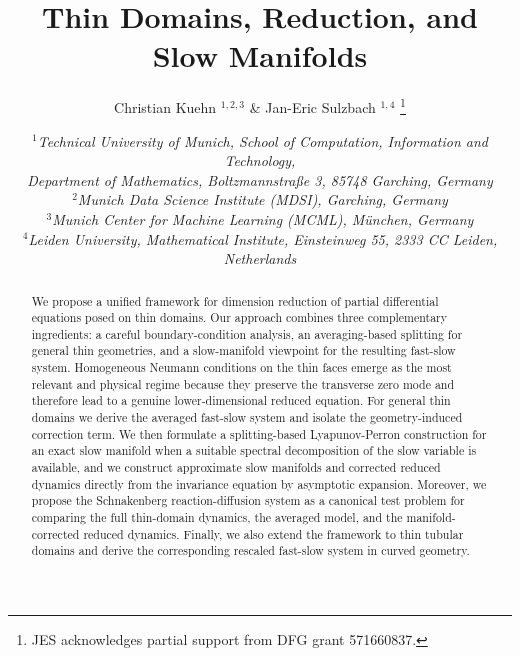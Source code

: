 \documentclass[11pt]{article}
\theoremstyle{definition}
\theoremstyle{remark}
\numberwithin{equation}{section}
\begin{document}
\title{\bf Thin Domains, Reduction, and Slow Manifolds} 


\author{Christian Kuehn $^{1,2,3}$
\& Jan-Eric Sulzbach $^{1,4}$ \thanks{JES acknowledges partial support from DFG grant 571660837.}
}

\date{
	\small{$^1$\textit{Technical University of Munich, School of Computation, Information and Technology, \\ Department of Mathematics, Boltzmannstraße 3, 85748 Garching, Germany} \\
	$^2$\textit{Munich Data Science Institute (MDSI), Garching, Germany } \\
	$^3$\textit{Munich Center for Machine Learning (MCML), München, Germany }\\
    $^4$\textit{Leiden University, Mathematical Institute, Einsteinweg 55, 2333 CC Leiden, Netherlands}}
}


\maketitle


\begin{abstract}
We propose a unified framework for dimension reduction of partial differential equations posed on thin domains.
Our approach combines three complementary ingredients: a careful boundary-condition analysis, an averaging-based splitting for general thin geometries, and a slow-manifold viewpoint for the resulting fast-slow system.
Homogeneous Neumann conditions on the thin faces emerge as the most relevant and physical regime because they preserve the transverse zero mode and therefore lead to a genuine lower-dimensional reduced equation. 
For general thin domains we derive the averaged fast-slow system and isolate the geometry-induced correction term.
We then formulate a splitting-based Lyapunov-Perron construction for an exact slow manifold when a suitable spectral decomposition of the slow variable is available, and we construct approximate slow manifolds and corrected reduced dynamics directly from the invariance equation by asymptotic expansion.
Moreover, we propose the Schnakenberg reaction-diffusion system as a canonical test problem for comparing the full thin-domain dynamics, the averaged model, and the manifold-corrected reduced dynamics.
Finally, we also extend the framework to thin tubular domains and derive the corresponding rescaled fast-slow system in
curved geometry.
\end{abstract}
\end{document}
